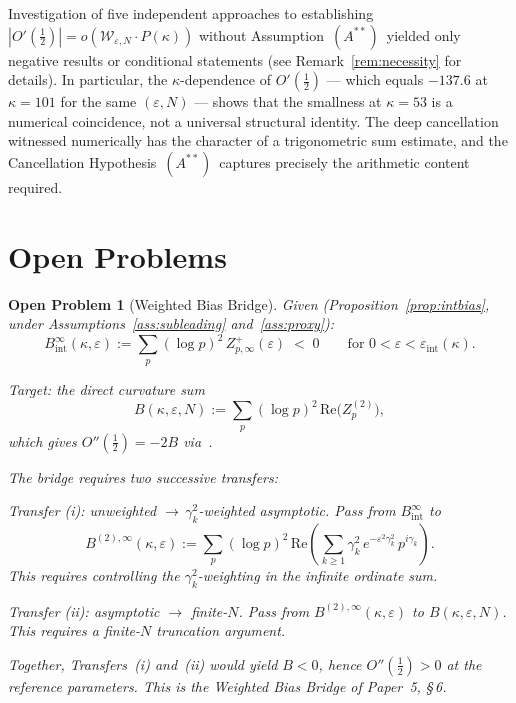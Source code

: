 \documentclass[11pt]{article}
\newtheorem{openproblem}[theorem]{Open Problem}
\newcommand{\Wgamma}{\mathcal{W}_{\varepsilon,N}}   %
\newcommand{\Astar}{\ensuremath{(A^{**})}}  %
\begin{document}
Investigation of five independent approaches to establishing
$|O'(\tfrac12)|=o(\Wgamma\cdot P(\kappa))$ without
Assumption~\Astar\ yielded only negative results or conditional statements
(see Remark~\ref{rem:necessity} for details).
In particular, the $\kappa$-dependence of $O'(\tfrac12)$ --- which equals
$-137.6$ at $\kappa=101$ for the same $(\varepsilon,N)$ --- shows that the
smallness at $\kappa=53$ is a numerical coincidence, not a universal
structural identity.
The deep cancellation witnessed numerically has the character of
a trigonometric sum estimate, and the Cancellation Hypothesis~\Astar\
captures precisely the arithmetic content required.

\section{Open Problems}
\label{sec:open}

\begin{openproblem}[Weighted Bias Bridge]
\label{op:wbridge}
\emph{Given} (Proposition~\ref{prop:intbias}, under
Assumptions~\ref{ass:subleading} and~\ref{ass:proxy}):
\[
B_{\mathrm{int}}^\infty(\kappa,\varepsilon)
 := \sum_p(\log p)^2\, Z_{p,\infty}^+(\varepsilon)
 \;<\; 0
\qquad
\text{for } 0<\varepsilon<\varepsilon_{\mathrm{int}}(\kappa).
\]

\emph{Target}: the direct curvature sum
\[
B(\kappa,\varepsilon,N)
 := \sum_p(\log p)^2\,\mathrm{Re}\bigl(Z_p^{(2)}\bigr),
\]
which gives $O''(\tfrac12)=-2B$ via~\cite{Paper6}.

The bridge requires two successive transfers:

\smallskip
\noindent\emph{Transfer (i): unweighted $\to\,\gamma_k^2$-weighted asymptotic.}
Pass from $B_{\mathrm{int}}^\infty$ to
\[
B^{(2),\infty}(\kappa,\varepsilon)
 := \sum_p(\log p)^2\,\mathrm{Re}\!\left(
    \sum_{k\ge 1}\gamma_k^2\,e^{-\varepsilon^2\gamma_k^2}
    \,p^{i\gamma_k}
    \right).
\]
This requires controlling the $\gamma_k^2$-weighting in the
infinite ordinate sum.

\smallskip
\noindent\emph{Transfer (ii): asymptotic $\to$ finite-$N$.}
Pass from $B^{(2),\infty}(\kappa,\varepsilon)$ to
$B(\kappa,\varepsilon,N)$.
This requires a finite-$N$ truncation argument.

\smallskip
Together, Transfers~(i) and~(ii) would yield $B<0$, hence
$O''(\tfrac12)>0$ at the reference parameters.
This is the \emph{Weighted Bias Bridge} of Paper~5, \S\,6.
\end{openproblem}
\end{document}
